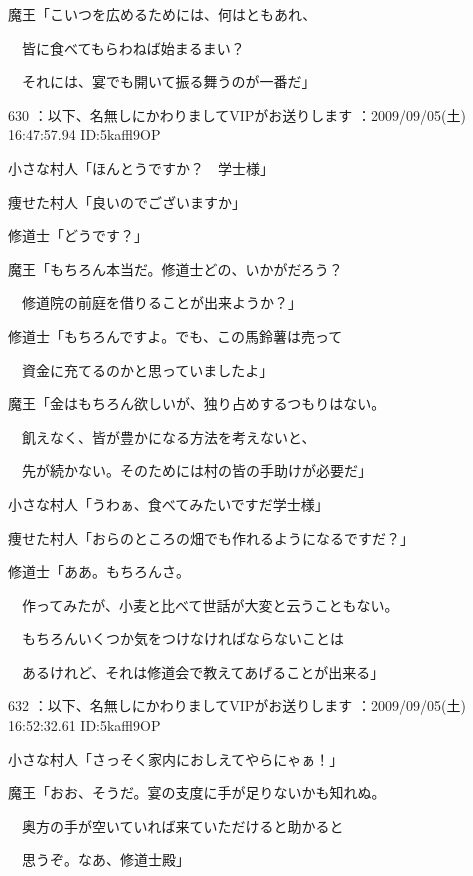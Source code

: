 \documentclass[a4j,twocolumn]{tarticle}
\begin{document}
魔王「こいつを広めるためには、何はともあれ、\par{} 
　皆に食べてもらわねば始まるまい？\par{} 
　それには、宴でも開いて振る舞うのが一番だ」 

	
    
    

630 ：以下、名無しにかわりましてVIPがお送りします ：2009/09/05(土) 16:47:57.94 ID:5kaffl9OP 


小さな村人「ほんとうですか？　学士様」\par{} 
痩せた村人「良いのでございますか」 



修道士「どうです？」 



魔王「もちろん本当だ。修道士どの、いかがだろう？ \par{}
　修道院の前庭を借りることが出来ようか？」 



修道士「もちろんですよ。でも、この馬鈴薯は売って\par{} 
　資金に充てるのかと思っていましたよ」 



魔王「金はもちろん欲しいが、独り占めするつもりはない。\par{} 
　飢えなく、皆が豊かになる方法を考えないと、\par{} 
　先が続かない。そのためには村の皆の手助けが必要だ」 



小さな村人「うわぁ、食べてみたいですだ学士様」 \par{}
痩せた村人「おらのところの畑でも作れるようになるですだ？」 



修道士「ああ。もちろんさ。\par{} 
　作ってみたが、小麦と比べて世話が大変と云うこともない。\par{} 
　もちろんいくつか気をつけなければならないことは\par{} 
　あるけれど、それは修道会で教えてあげることが出来る」 

	
    
    

632 ：以下、名無しにかわりましてVIPがお送りします ：2009/09/05(土) 16:52:32.61 ID:5kaffl9OP 


小さな村人「さっそく家内におしえてやらにゃぁ！」 



魔王「おお、そうだ。宴の支度に手が足りないかも知れぬ。\par{} 
　奥方の手が空いていれば来ていただけると助かると\par{} 
　思うぞ。なあ、修道士殿」 
\end{document}
